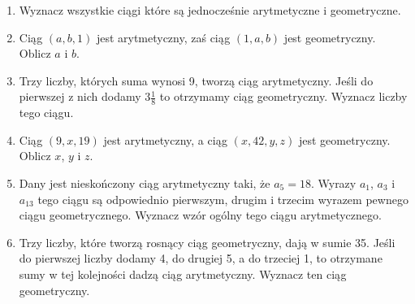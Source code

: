 \documentclass[12pt,a4paper]{article}
\begin{document}
\begin{enumerate}[1.]	
	\item Wyznacz wszystkie ciągi które są jednocześnie arytmetyczne i geometryczne.
	
	\item Ciąg $(a,b,1)$ jest arytmetyczny, zaś ciąg $(1,a,b)$ jest geometryczny. Oblicz $a$ i $b$.
	
	\item Trzy liczby, których suma wynosi 9, tworzą ciąg arytmetyczny. Jeśli do pierwszej z nich dodamy $3\frac{1}{8}$ to otrzymamy ciąg geometryczny. Wyznacz liczby tego ciągu.
	
	\item Ciąg $(9,x,19)$ jest arytmetyczny, a ciąg $(x,42,y,z)$ jest geometryczny. Oblicz $x$, $y$ i $z$.
	
	\item Dany jest nieskończony ciąg arytmetyczny taki, że $a_5=18$. Wyrazy $a_1$, $a_3$ i $a_13$ tego ciągu są odpowiednio pierwszym, drugim i trzecim wyrazem pewnego ciągu geometrycznego. Wyznacz wzór ogólny tego ciągu arytmetycznego.
	
	\item Trzy liczby, które tworzą rosnący ciąg geometryczny, dają w sumie 35. Jeśli do pierwszej liczby dodamy 4, do drugiej 5, a do trzeciej 1, to otrzymane sumy w tej kolejności dadzą ciąg arytmetyczny. Wyznacz ten ciąg geometryczny.
	
	
\end{enumerate}
\end{document}
